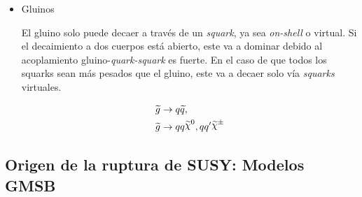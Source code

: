 \begin{itemize}
\item Gluinos

  El gluino solo puede decaer a través de un \emph{squark}, ya sea \emph{on-shell} o virtual. Si
  el decaimiento a dos cuerpos está abierto, este va a dominar debido al
  acoplamiento gluino-\emph{quark-squark} es fuerte. En el caso de que todos
  los squarks sean más pesados que el gluino, este va a decaer solo vía \emph{squarks}
  virtuales.

  \begin{align}
    &\gluino \to q\susy{q}, \\
    &\gluino \to qq\nino, qq^\prime \chinopm
  \end{align}

\end{itemize}



\subsection{Origen de la ruptura de SUSY: Modelos GMSB}



